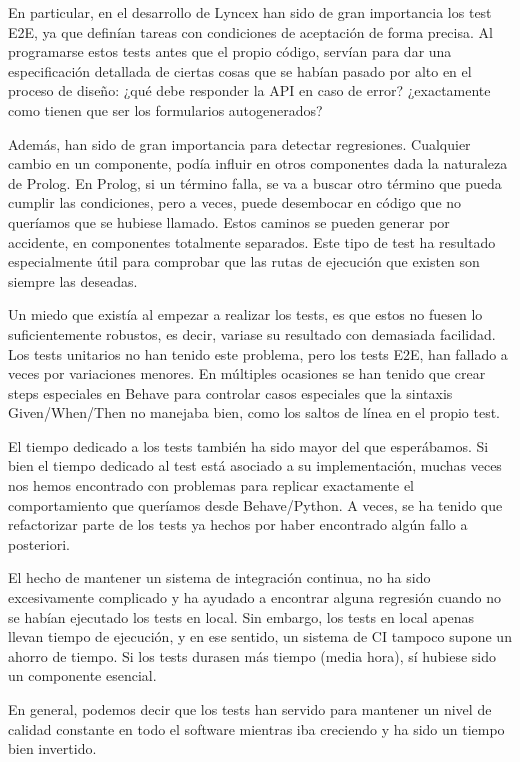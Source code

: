 \documentclass[openright,twoside,12pt]{book}
\begin{document}
En particular, en el desarrollo de Lyncex han sido de gran importancia los test E2E, ya que definían tareas con condiciones de aceptación de forma precisa. Al programarse estos tests antes que el propio código, servían para dar una especificación detallada de ciertas cosas que se habían pasado por alto en el proceso de diseño: ¿qué debe responder la API en caso de error? ¿exactamente como tienen que ser los formularios autogenerados?

Además, han sido de gran importancia para detectar regresiones. Cualquier cambio en un componente, podía influir en otros componentes dada la naturaleza de Prolog. En Prolog, si un término falla, se va a buscar otro término que pueda cumplir las condiciones, pero a veces, puede desembocar en código que no queríamos que se hubiese llamado. Estos caminos se pueden generar por accidente, en componentes totalmente separados. Este tipo de test ha resultado especialmente útil para comprobar que las rutas de ejecución que existen son siempre las deseadas.

Un miedo que existía al empezar a realizar los tests, es que estos no fuesen lo suficientemente robustos, es decir, variase su resultado con demasiada facilidad. Los tests unitarios no han tenido este problema, pero los tests E2E, han fallado a veces por variaciones menores. En múltiples ocasiones se han tenido que crear steps especiales en Behave para controlar casos especiales que la sintaxis Given/When/Then no manejaba bien, como los saltos de línea en el propio test.

El tiempo dedicado a los tests también ha sido mayor del que esperábamos. Si bien el tiempo dedicado al test está asociado a su implementación, muchas veces nos hemos encontrado con problemas para replicar exactamente el comportamiento que queríamos desde Behave/Python. A veces, se ha tenido que refactorizar parte de los tests ya hechos por haber encontrado algún fallo a posteriori.

El hecho de mantener un sistema de integración continua, no ha sido excesivamente complicado y ha ayudado a encontrar alguna regresión cuando no se habían ejecutado los tests en local. Sin embargo, los tests en local apenas llevan tiempo de ejecución, y en ese sentido, un sistema de CI tampoco supone un ahorro de tiempo. Si los tests durasen más tiempo (media hora), sí hubiese sido un componente esencial.

En general, podemos decir que los tests han servido para mantener un nivel de calidad constante en todo el software mientras iba creciendo y ha sido un tiempo bien invertido.
\end{document}
